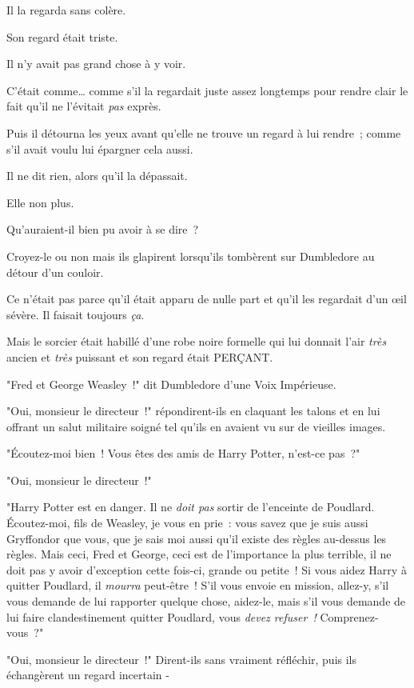 Il la regarda sans colère.

Son regard était triste.

Il n'y avait pas grand chose à y voir.

C'était comme… comme s'il la regardait juste assez longtemps pour rendre clair le fait qu'il ne l'évitait \emph{pas} exprès.

Puis il détourna les yeux avant qu'elle ne trouve un regard à lui rendre~; comme s'il avait voulu lui épargner cela aussi.

Il ne dit rien, alors qu'il la dépassait.

Elle non plus.

Qu'auraient-il bien pu avoir à se dire~?


Croyez-le ou non mais ils glapirent lorsqu'ils tombèrent sur Dumbledore au détour d'un couloir.

Ce n'était pas parce qu'il était apparu de nulle part et qu'il les regardait d'un œil sévère. Il faisait toujours \emph{ça}.

Mais le sorcier était habillé d’une robe noire formelle qui lui donnait l'air \emph{très} ancien et \emph{très} puissant et son regard était PERÇANT.

"Fred et George Weasley~!" dit Dumbledore d'une Voix Impérieuse.

"Oui, monsieur le directeur~!" répondirent-ils en claquant les talons et en lui offrant un salut militaire soigné tel qu'ils en avaient vu sur de vieilles images.

"Écoutez-moi bien~! Vous êtes des amis de Harry Potter, n'est-ce pas~?"

"Oui, monsieur le directeur~!"

"Harry Potter est en danger. Il ne \emph{doit pas} sortir de l'enceinte de Poudlard. Écoutez-moi, fils de Weasley, je vous en prie~: vous savez que je suis aussi Gryffondor que vous, que je sais moi aussi qu'il existe des règles au-dessus les règles. Mais ceci, Fred et George, ceci est de l'importance la plus terrible, il ne doit pas y avoir d'exception cette fois-ci, grande ou petite~! Si vous aidez Harry à quitter Poudlard, il \emph{mourra} peut-être~! S'il vous envoie en mission, allez-y, s'il vous demande de lui rapporter quelque chose, aidez-le, mais s'il vous demande de lui faire clandestinement quitter Poudlard, vous \emph{devez refuser~!} Comprenez-vous~?"

"Oui, monsieur le directeur~!" Dirent-ils sans vraiment réfléchir, puis ils échangèrent un regard incertain -

